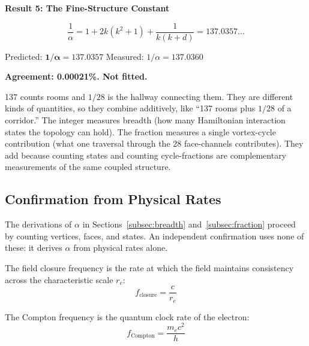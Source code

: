 \documentclass[aps,prd,preprint,superscriptaddress,showpacs,preprintnumbers,amsmath,amssymb,nofootinbib]{revtex4-2}
\begin{document}
\vspace{1.5em}
\noindent
\colorbox{resultgreen}{\parbox{\dimexpr\textwidth-2\fboxsep\relax}{%
\vspace{0.8em}
\centering
\textbf{\large Result 5: The Fine-Structure Constant}

\vspace{0.5em}
\boldmath
\begin{equation}
\frac{1}{\alpha} = 1 + 2k(k^2 + 1) + \frac{1}{k(k+d)} = 137.0357\ldots
\end{equation}
\unboldmath

\vspace{0.3em}
Predicted: $\bm{1/\alpha = 137.0357}$ \quad Measured: $1/\alpha = 137.0360$~\cite{codata2022}

\textbf{Agreement: 0.00021\%. Not fitted.}
\vspace{0.5em}
}}
\vspace{1cm}

137 counts rooms and $1/28$ is the hallway connecting them. They are different kinds of quantities, so they combine additively, like ``137 rooms plus $1/28$ of a corridor.'' The integer measures breadth (how many Hamiltonian interaction states the topology can hold). The fraction measures a single vortex-cycle contribution (what one traversal through the 28 face-channels contributes). They add because counting states and counting cycle-fractions are complementary measurements of the same coupled structure.

\subsection{Confirmation from Physical Rates}
\label{subsec:rates}

The derivations of $\alpha$ in Sections~\ref{subsec:breadth} and~\ref{subsec:fraction} proceed by counting vertices, faces, and states. An independent confirmation uses none of these: it derives $\alpha$ from physical rates alone.

The field closure frequency is the rate at which the field maintains consistency across the characteristic scale $r_e$:
\begin{equation}
f_{\text{closure}} = \frac{c}{r_e}
\end{equation}

The Compton frequency is the quantum clock rate of the electron:
\begin{equation}
f_{\text{Compton}} = \frac{m_e c^2}{h}
\end{equation}
\end{document}

